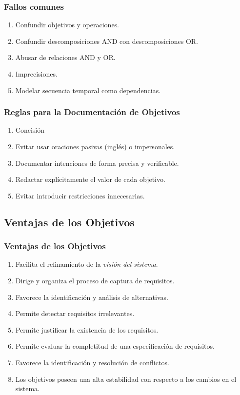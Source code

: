\documentclass[slidestop,xcolor=pst,dvips,blue]{beamer}
\begin{document}
\begin{frame}[c]
    \frametitle{Fallos comunes}
    \begin{enumerate}[<+->]
         \item Confundir objetivos y operaciones.
         \item Confundir descomposiciones AND con descomposiciones OR.
         \item Abusar de relaciones AND y OR.
         \item Imprecisiones.
         \item Modelar secuencia temporal como dependencias.
    \end{enumerate}
\end{frame}

\begin{frame}[c]
    \frametitle{Reglas para la Documentación de Objetivos}
    \begin{enumerate}[<+->]
        \item Concisión
        \item Evitar usar oraciones pasivas (inglés) o impersonales.
        \item Documentar intenciones de forma precisa y verificable.
        \item Redactar explícitamente el valor de cada objetivo.
        \item Evitar introducir restricciones innecesarias.
    \end{enumerate}
\end{frame}

\subsection{Ventajas de los Objetivos}

\begin{frame}[c]
	\frametitle{Ventajas de los Objetivos}
	\begin{enumerate}[<+->]
		\item Facilita el refinamiento de la \emph{visión del sistema}.
		\item Dirige y organiza el proceso de captura de requisitos.
		\item Favorece la identificación y análisis de alternativas.
		\item Permite detectar requisitos irrelevantes.
		\item Permite justificar la existencia de los requisitos.
		\item Permite evaluar la completitud de una especificación de requisitos.
		\item Favorece la identificación y resolución de conflictos.
		\item Los objetivos poseen una alta estabilidad con respecto a los cambios en el sistema.
	\end{enumerate}
\end{frame}
\end{document}
